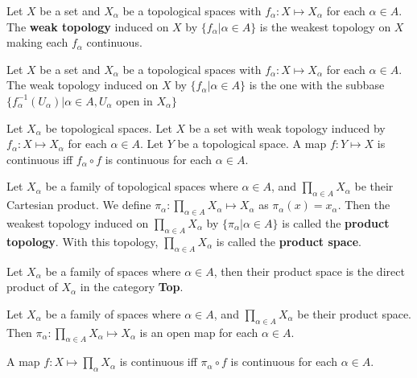 \documentclass[12pt]{book}
\begin{document}
\begin{definition}
	Let $X$ be a set and $X_\alpha$ be a topological spaces with $f_\alpha:X\mapsto X_\alpha$ for each $\alpha\in A$. The {\bf weak topology} induced on $X$ by $\{f_\alpha|\alpha\in A\}$ is the weakest topology on $X$ making each $f_\alpha$ continuous.
\end{definition}

\begin{theorem}
	Let $X$ be a set and $X_\alpha$ be a topological spaces with $f_\alpha:X\mapsto X_\alpha$ for each $\alpha\in A$. The weak topology induced on $X$ by $\{f_\alpha|\alpha\in A\}$ is the one with the subbase $\{f^{-1}_\alpha(U_\alpha)|\alpha\in A, U_\alpha$ open in $X_\alpha\}$
\end{theorem}

\begin{theorem}
	Let $X_\alpha$ be topological spaces. Let $X$ be a set with weak topology induced by $f_\alpha:X\mapsto X_\alpha$ for each $\alpha\in A$. Let $Y$ be a topological space. A map $f:Y\mapsto X$ is continuous iff $f_\alpha\circ f$ is continuous for each $\alpha \in A$.
\end{theorem}

\begin{definition}
	Let $X_\alpha$ be a family of topological spaces where $\alpha\in A$, and $\prod_{\alpha\in A}X_\alpha$ be their Cartesian product. We define $\pi_\alpha: \prod_{\alpha\in A}X_\alpha\mapsto X_\alpha$ as $\pi_\alpha(x)=x_\alpha$. Then the weakest topology induced on $\prod_{\alpha\in A}X_\alpha$ by  $\{\pi_\alpha|\alpha\in A\}$ is called the {\bf product topology}. With this topology, $\prod_{\alpha\in A}X_\alpha$ is called the {\bf product space}.
\end{definition}
\begin{theorem}
	Let $X_\alpha$ be a family of spaces where $\alpha\in A$, then their product space is the direct product of $X_\alpha$ in the category {\bf Top}.
\end{theorem}

\begin{theorem}
	Let $X_\alpha$ be a family of spaces where $\alpha\in A$, and $\prod_{\alpha\in A}X_\alpha$ be their product space. Then $\pi_\alpha: \prod_{\alpha\in A}X_\alpha\mapsto X_\alpha$ is an open map for each $\alpha \in A$.
\end{theorem}

\begin{theorem}
	A map $f:X\mapsto\prod_\alpha X_\alpha$ is continuous iff $\pi_\alpha\circ f$ is continuous for each $\alpha\in A$.
\end{theorem}
\end{document}
